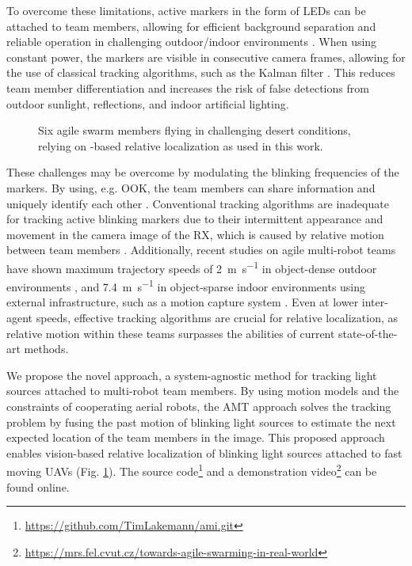\documentclass[lettersize,preprint]{elsarticle}
\begin{document}
To overcome these limitations, active markers in the form of \glspl{LED} can be attached to team members, allowing for efficient background separation and reliable operation in challenging outdoor/indoor environments \cite{stuckeyRealTimeOpticalLocalization2024,whiteOpticalSpatialLocalization2019, teixeiraVIRPEVisualInertialRelative2018, walterUVDARSystemVisual2019, faesslerMonocularPoseEstimation2014, limHemisphericalInfraRedIR2022}.
When using constant power, the markers are visible in consecutive camera frames, allowing for the use of classical tracking algorithms, such as the Kalman filter \cite{jinVisionTrackingSystem2016b, doVisibleLightCommunicationBased2019, huangImprovedTargetSignal2018}. 
This reduces team member differentiation and increases the risk of false detections from outdoor sunlight, reflections, and indoor artificial lighting.

\begin{figure}[t]
  \centering
  \scalebox{1.5}{}
  \caption{Six agile swarm members flying in challenging desert conditions, relying on -based relative localization as used in this work.}
  \vspace{-5pt}
  \label{fig:intro:overview}
\end{figure}

These challenges may be overcome by modulating the blinking frequencies of the markers.
By using, e.g. \gls{OOK}, the team members can share information and uniquely identify each other \cite{whiteOpticalSpatialLocalization2019,whiteRobustOpticalSpatial2019,diasOnboardVisionbased3D2016, stuckeyOpticalSpatialLocalization2021,stuckeySpatialLocalizationAttitude2022}.
Conventional tracking algorithms are inadequate for tracking active blinking markers due to their intermittent appearance and movement in the camera image of the \gls{RX}, which is caused by relative motion between team members \cite{chenUltravioletBasedUAVSwarm2022}.
Additionally, recent studies on agile multi-robot teams have shown maximum trajectory speeds of \SI{2}{\meter\per\second} in object-dense outdoor environments \cite{zhouSwarmMicroFlying2022}, and \SI{7.4}{\meter\per\second} in object-sparse indoor environments using external infrastructure, such as a motion capture system \cite{ryouCooperativeMultiAgentTrajectory2022}.
Even at lower inter-agent speeds, effective tracking algorithms are crucial for relative localization, as relative motion within these teams surpasses the abilities of current state-of-the-art methods.

We propose the novel  approach, a system-agnostic method for tracking light sources attached to multi-robot team members.
By using motion models and the constraints of cooperating aerial robots, the \gls{AMT} approach solves the tracking problem by fusing the past motion of blinking light sources to estimate the next expected location of the team members in the image.
This proposed approach enables vision-based relative localization of blinking light sources attached to fast moving \glspl{UAV} (Fig. \ref{fig:intro:overview}).
The source code\footnote{\url{https://github.com/TimLakemann/ami.git}} and a demonstration video\footnote{\url{https://mrs.fel.cvut.cz/towards-agile-swarming-in-real-world}} can be found online.
\end{document}
